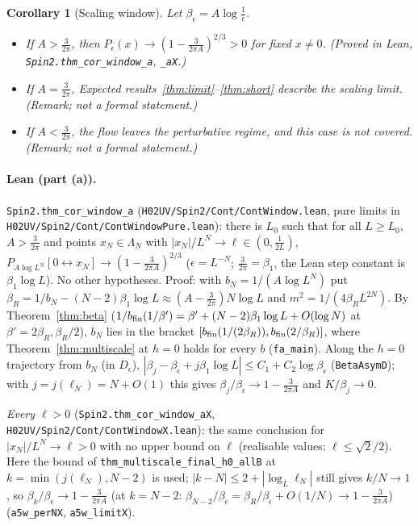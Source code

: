 \documentclass[11pt]{amsart}
\newtheorem{corollary}[theorem]{Corollary}
\theoremstyle{definition}
\theoremstyle{remark}
\numberwithin{equation}{section}
\begin{document}
\begin{corollary}[Scaling window]\label{cor:window}
Let $\beta_\epsilon=A\log\frac1\epsilon$.
\begin{itemize}
\item[(a)] If $A>\frac3{2\pi}$, then $P_\epsilon(x)\to(1-\frac3{2\pi A})^{2/3}>0$ for fixed $x\ne0$.
  (Proved in Lean, \texttt{Spin2.thm\_cor\_window\_a}, \texttt{\_aX}.)
\item[(b)] If $A=\frac3{2\pi}$, Expected results~\ref{thm:limit}--\ref{thm:short} describe the scaling
  limit. (Remark; not a formal statement.)
\item[(c)] If $A<\frac3{2\pi}$, the flow leaves the perturbative regime, and this case is not covered.
  (Remark; not a formal statement.)
\end{itemize}
\end{corollary}

\paragraph{Lean (part (a)).} \texttt{Spin2.thm\_cor\_window\_a} (\texttt{H02UV/Spin2/Cont/ContWindow.lean},
pure limits in \texttt{H02UV/Spin2/Cont/ContWindowPure.lean}): there is $L_0$ such that for all $L\ge L_0$,
$A>\frac3{2\pi}$ and points $x_N\in\Lambda_N$ with $|x_N|/L^N\to\ell\in(0,\frac1{2L})$,
$P_{A\log L^N}[0\leftrightarrow x_N]\to(1-\frac3{2\pi A})^{2/3}$ ($\epsilon=L^{-N}$; $\frac3{2\pi}=\beta_1$,
the Lean step constant is $\beta_1\log L$). No other hypotheses. Proof: with $b_N=1/(A\log L^N)$ put
$\beta_R=1/b_N-(N-2)\beta_1\log L\approx(A-\frac3{2\pi})N\log L$ and $m^2=1/(4\beta_RL^{2N})$. By
Theorem~\ref{thm:beta} ($1/b_{\rm fin}(1/\beta')=\beta'+(N-2)\beta_1\log L+O(\log N)$ at $\beta'=2\beta_R,\beta_R/2$),
$b_N$ lies in the bracket $[b_{\rm fin}(1/(2\beta_R)),b_{\rm fin}(2/\beta_R)]$, where
Theorem~\ref{thm:multiscale} at $h=0$ holds for every $b$ (\texttt{fa\_main}). Along the $h=0$
trajectory from $b_N$ (in $D_\epsilon$), $|\beta_j-\beta_\epsilon+j\beta_1\log L|\le C_1+C_2\log\beta_\epsilon$
(\texttt{BetaAsymD}); with $j=j(\ell_N)=N+O(1)$ this gives $\beta_j/\beta_\epsilon\to1-\frac3{2\pi A}$ and
$K/\beta_j\to0$.

\emph{Every $\ell>0$} (\texttt{Spin2.thm\_cor\_window\_aX}, \texttt{H02UV/Spin2/Cont/ContWindowX.lean}): the same conclusion for
$|x_N|/L^N\to\ell>0$ with no upper bound on $\ell$ (realisable values: $\ell\le\sqrt2/2$). Here the bound of
\texttt{thm\_multiscale\_final\_h0\_allB} at $k=\min(j(\ell_N),N-2)$ is used; $|k-N|\le2+|\log_L\ell_N|$ still gives $k/N\to1$, so
$\beta_k/\beta_\epsilon\to1-\frac3{2\pi A}$ (at $k=N-2$: $\beta_{N-2}/\beta_\epsilon=\beta_R/\beta_\epsilon+O(1/N)\to1-\frac3{2\pi A}$)
(\texttt{a5w\_perNX}, \texttt{a5w\_limitX}).
\end{document}
